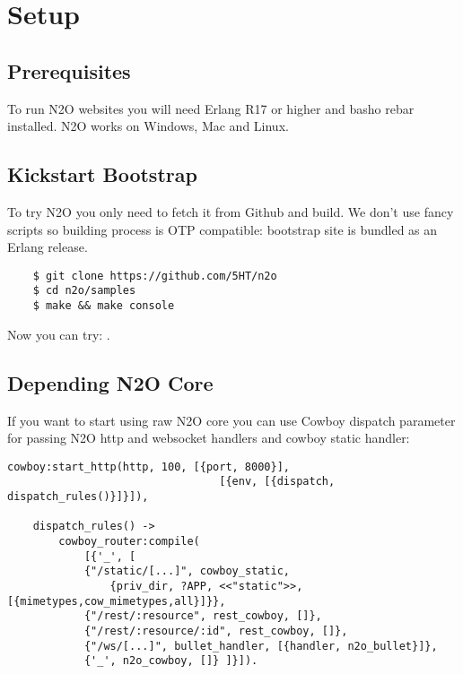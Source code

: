 \section{Setup}

\subsection{Prerequisites}
To run N2O websites you will need Erlang R17 or higher and basho rebar installed.
N2O works on Windows, Mac and Linux.

\subsection{Kickstart Bootstrap}
To try N2O you only need to fetch it from Github and build. We don't use
fancy scripts so building process is OTP compatible: bootstrap site
is bundled as an Erlang release.

\vspace{1\baselineskip}
\begin{lstlisting}
    $ git clone https://github.com/5HT/n2o
    $ cd n2o/samples
    $ make && make console
\end{lstlisting}
\vspace{1\baselineskip}

Now you can try: .

\newpage
\subsection{Depending N2O Core}
If you want to start using raw N2O core you can use Cowboy dispatch parameter
for passing N2O http and websocket handlers and cowboy static handler:

\begin{lstlisting}[caption=web\_sup.erl]
    cowboy:start_http(http, 100, [{port, 8000}],
                                 [{env, [{dispatch, dispatch_rules()}]}]),

    dispatch_rules() ->
        cowboy_router:compile(
            [{'_', [
            {"/static/[...]", cowboy_static,
                {priv_dir, ?APP, <<"static">>,[{mimetypes,cow_mimetypes,all}]}},
            {"/rest/:resource", rest_cowboy, []},
            {"/rest/:resource/:id", rest_cowboy, []},
            {"/ws/[...]", bullet_handler, [{handler, n2o_bullet}]},
            {'_', n2o_cowboy, []} ]}]).
\end{lstlisting}

